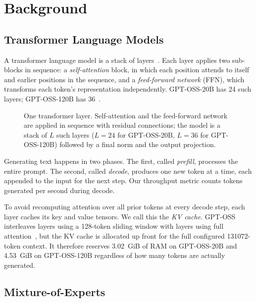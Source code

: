 \chapter{Background}\label{chapter:background}

\section{Transformer Language Models}\label{sec:bg-transformer}

A transformer language model is a stack of layers~\cite{vaswani2017attention}.
Each layer applies two sub-blocks in sequence: a \emph{self-attention} block, in which each position attends to itself and earlier positions in the sequence, and a \emph{feed-forward network} (FFN), which transforms each token's representation independently.
GPT-OSS-20B has 24 such layers; GPT-OSS-120B has 36~\cite{openai2025gptoss}.

\begin{figure}[htbp]
\centering
\resizebox{0.55\textwidth}{!}{}
\caption[Decoder-only transformer block]{One transformer layer. Self-attention and the feed-forward network are applied in sequence with residual connections; the model is a stack of $L$ such layers ($L=24$ for GPT-OSS-20B, $L=36$ for GPT-OSS-120B) followed by a final norm and the output projection.}
\label{fig:transformer-block}
\end{figure}

Generating text happens in two phases.
The first, called \emph{prefill}, processes the entire prompt.
The second, called \emph{decode}, produces one new token at a time, each appended to the input for the next step.
Our throughput metric counts tokens generated per second during decode.

To avoid recomputing attention over all prior tokens at every decode step, each layer caches its key and value tensors.
We call this the \emph{KV cache}.
GPT-OSS interleaves layers using a 128-token sliding window with layers using full attention~\cite{openai2025gptoss}, but the KV cache is allocated up front for the full configured 131072-token context.
It therefore reserves 3.02~GiB of RAM on GPT-OSS-20B and 4.53~GiB on GPT-OSS-120B regardless of how many tokens are actually generated.


\section{Mixture-of-Experts}\label{sec:bg-moe}

